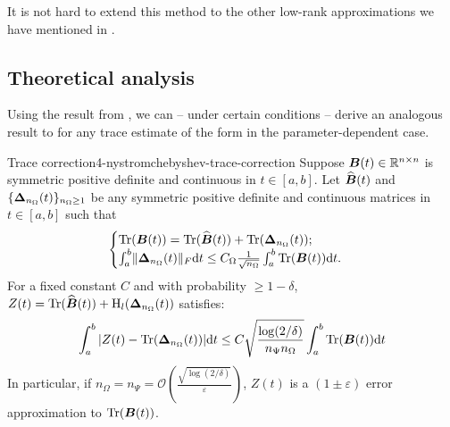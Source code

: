 It is not hard to extend this method to the other low-rank approximations
we have mentioned in .


\subsection{Theoretical analysis}
\label{subsec:4-nystromchebyshev-analysis}

Using the result from ,
we can -- under certain conditions -- derive an analogous result
to \cite{meyer2021hutch} for any trace estimate of the form
 in the parameter-dependent case.

\begin{theorem}{Trace correction}{4-nystromchebyshev-trace-correction}
    Suppose $\boldsymbol{B}(t) \in \mathbb{R}^{n \times n}$ is symmetric positive definite
    and continuous in $t \in [a, b]$. Let $\widehat{\boldsymbol{B}}(t)$ and
    $\{\boldsymbol{\Delta}_{n_{\Omega}}(t)\}_{n_{\Omega} \geq 1}$ be any
    symmetric positive definite and continuous matrices in $t \in [a, b]$ such that
    \begin{equation}
        \begin{cases}
            \operatorname{Tr}(\boldsymbol{B}(t)) = \operatorname{Tr}(\widehat{\boldsymbol{B}}(t)) + \operatorname{Tr}(\boldsymbol{\Delta}_{n_{\Omega}}(t)); \\
            \int_{a}^{b} \lVert \boldsymbol{\Delta}_{n_{\Omega}}(t) \rVert _F \mathrm{d}t \leq C_{\Omega} \frac{1}{\sqrt{n_{\Omega}}} \int_{a}^{b} \operatorname{Tr}(\boldsymbol{B}(t)) \mathrm{d}t.
        \end{cases}
    \end{equation}
    For a fixed constant $C$ and with probability $\geq 1 - \delta$, $Z(t) = \operatorname{Tr}(\widehat{\boldsymbol{B}}(t)) + \operatorname{H}_l(\boldsymbol{\Delta}_{n_{\Omega}}(t))$ satisfies:
    \begin{equation}
        \int_{a}^{b} |Z(t) - \operatorname{Tr}(\boldsymbol{\Delta}_{n_{\Omega}}(t))| \mathrm{d}t \leq C \sqrt{\frac{\log(2/\delta)}{n_{\Psi} n_{\Omega}}} \int_{a}^{b} \operatorname{Tr}(\boldsymbol{B}(t)) \mathrm{d}t
    \end{equation}
    In particular, if $n_{\Omega}=n_{\Psi}=\mathcal{O}\left( \frac{\sqrt{\log(2/\delta)}}{\varepsilon} \right)$, $Z(t)$ is a $(1 \pm \varepsilon)$ error approximation to $\operatorname{Tr}(\boldsymbol{B}(t))$.
\end{theorem}


